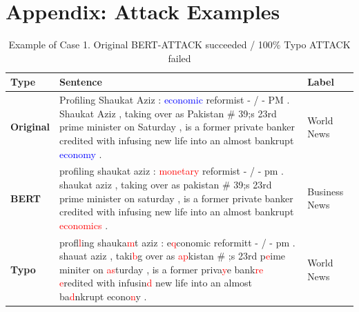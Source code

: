 \documentclass[11pt,a4paper]{article}
\newcommand{\red}[1]{\textcolor{red}{#1}}
\newcommand{\blue}[1]{\textcolor{blue}{#1}}
\begin{document}
\clearpage




\clearpage

\appendix

\onecolumn

\section{Appendix: Attack Examples}


\label{sec:appendix}
{\renewcommand{\arraystretch}{1.5}
\begin{table}[h!]
{\small
\begin{tabularx}{\textwidth}{l|X|l}
\hline
\textbf{Type} & \textbf{Sentence}  & \textbf{Label}  \\ \hline
\textbf{Original}  & Profiling Shaukat Aziz : \blue{economic} reformist - / - PM . Shaukat Aziz , taking over as Pakistan \newline \# 39;s 23rd prime minister on Saturday , is a former private banker credited with infusing new \newline life into an almost bankrupt \blue{economy} .   & World News    \\ \hline
\textbf{BERT} & profiling shaukat aziz : \red{monetary} reformist - / - pm . shaukat aziz , taking over as pakistan \# 39;s \newline 23rd prime minister on saturday , is a former private banker credited with infusing new life \newline into an almost bankrupt \red{economics} . & Business News \\ \hline
\textbf{Typo} & prof\red{ll}ing shauka\red{m}t aziz : e\red{q}conomic reformitt - / - pm . shauat aziz , taki\red{b}g over as \red{ap}kistan \# \newline 39;s 23rd p\red{e}ime miniter on \red{as}turday , is a former priva\red{y}e bank\red{re} \red{e}redited with infusin\red{d} new life
\newline into an almost ba\red{d}nkrupt econo\red{n}y .  & World News    \\ \hline
\end{tabularx}
}
\caption{Example of Case 1. Original BERT-ATTACK succeeded / 100\% Typo ATTACK failed }
\end{table}
}
\end{document}
